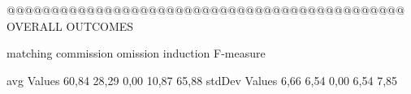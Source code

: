  @@@@@@@@@@@@@@@@@@@@@@@@@@@@@@@@@@@@@@@@@@@@@ OVERALL OUTCOMES

                matching commission   omission  induction  F-measure
      
avg Values      60,84      28,29       0,00      10,87    65,88      
stdDev Values    6,66       6,54       0,00       6,54     7,85       
